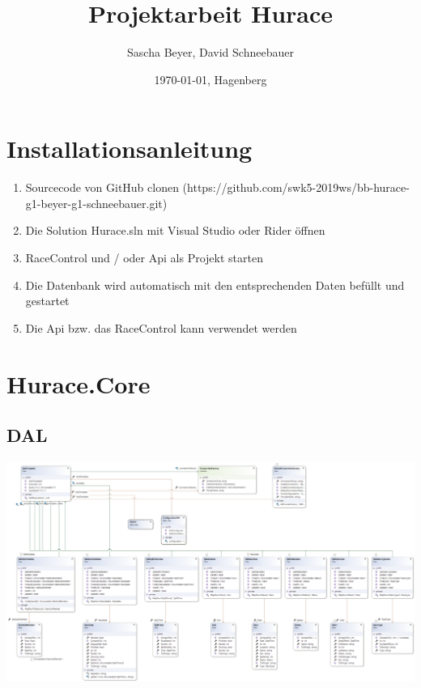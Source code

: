 \documentclass[a4paper, 12pt]{article}
\title{Projektarbeit Hurace}
\author{Sascha Beyer, David Schneebauer}
\date{\today{}, Hagenberg}
\begin{document}
	\maketitle
	\tableofcontents
	\newpage
	\section{Installationsanleitung}
	
	\begin{enumerate}
		\item{Sourcecode von GitHub clonen (https://github.com/swk5-2019ws/bb-hurace-g1-beyer-g1-schneebauer.git)}
		\item{Die Solution Hurace.sln mit Visual Studio oder Rider öffnen}
		\item{RaceControl und / oder Api als Projekt starten}
		\item{Die Datenbank wird automatisch mit den entsprechenden Daten befüllt und gestartet}
		\item{Die Api bzw. das RaceControl kann verwendet werden}
	\end{enumerate}
	
	

	\section{Hurace.Core}
	\subsection{DAL}
	\includegraphics[width=.9\textwidth]{img/DAL.png}
\end{document}

